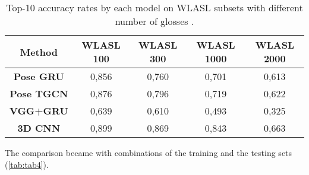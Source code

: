 \documentclass[12pt]{book}
\begin{document}
\begin{table}[!htbp]
\centering
\begin{tabular}{|c|c|c|c|c|}
\hline
{\textbf{Method}}    & {\textbf{WLASL 100}} & {\textbf{WLASL 300}} & {\textbf{WLASL 1000}} & { \textbf{WLASL 2000}} \\ \hline
{ \textbf{Pose GRU}}  & { 0,856}              & { 0,760}              & { 0,701}               & { 0,613}               \\ \hline
{ \textbf{Pose TGCN}} & { 0,876}              & { 0,796}              & { 0,719}               & { 0,622}               \\ \hline
{ \textbf{VGG+GRU}}   & { 0,639}              & { 0,610}              & { 0,493}               & { 0,325}               \\ \hline
{ \textbf{3D CNN}}    & { 0,899}              & { 0,869}              & { 0,843}               & { 0,663}               \\ \hline
\end{tabular}
\caption{Top-10 accuracy rates by each model on WLASL subsets with different number of glosses \cite{DON2020}.}
\label{tab:tab3}
\end{table}

The comparison became with combinations of the training and the testing sets (\ref{tab:tab4}). 
\end{document}
